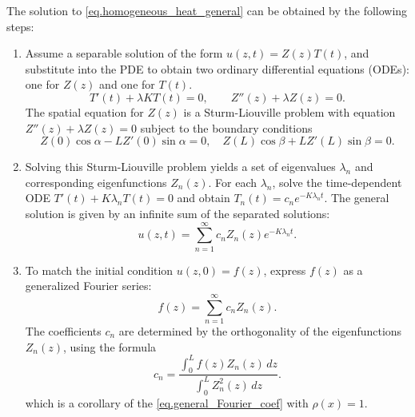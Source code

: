 \begin{theorem}\label{th.solve_homogeneous_heat}
    The solution to \eqref{eq.homogeneous_heat_general} can be obtained by the following steps:
    \begin{enumerate}
        \item Assume a separable solution of the form $u(z, t) = Z(z)T(t)$, and substitute into the PDE to obtain two ordinary differential equations (ODEs): one for $Z(z)$ and one for $T(t)$.
        \[
            T'(t) + \lambda K T(t) = 0, \qquad Z''(z) + \lambda Z(z) = 0.
        \]
        The spatial equation for $Z(z)$ is a Sturm-Liouville problem with equation $Z''(z) + \lambda Z(z) = 0$
        subject to the boundary conditions
        \[
        Z(0) \cos \alpha - L Z'(0) \sin \alpha = 0, \quad Z(L) \cos \beta + L Z'(L) \sin \beta = 0.
        \]
        
        \item Solving this Sturm-Liouville problem yields a set of eigenvalues $\lambda_n$ and corresponding eigenfunctions $Z_n(z)$. For each $\lambda_n$, solve the time-dependent ODE $T'(t) + K \lambda_n T(t) = 0$ and obtain $T_n(t) = c_n e^{-K \lambda_n t}$.
        The general solution is given by an infinite sum of the separated solutions:
        \[
        u(z, t) = \sum_{n=1}^{\infty} c_n Z_n(z) e^{-K \lambda_n t}.
        \]
        \item To match the initial condition $u(z, 0) = f(z)$, express $f(z)$ as a generalized Fourier series:
        \[
        f(z) = \sum_{n=1}^{\infty} c_n Z_n(z).
        \]
        The coefficients $c_n$ are determined by the orthogonality of the eigenfunctions $Z_n(z)$, using the formula
        \begin{equation}\label{eq.coef_formula_homogeneous}
            c_n = \frac{\int_0^L f(z) Z_n(z) \, dz}{\int_0^L Z_n^2(z) \, dz}.
        \end{equation}
        which is a corollary of the \eqref{eq.general_Fourier_coef} with $\rho(x) = 1$.
    \end{enumerate}
\end{theorem}



